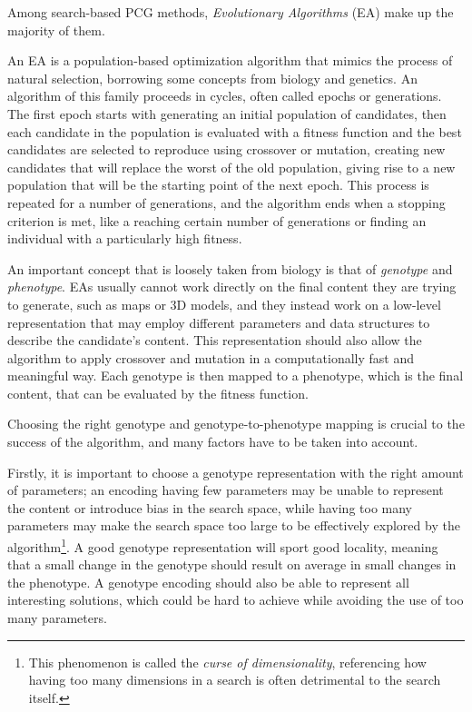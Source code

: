 \documentclass{Configuration_Files/PoliMi3i_thesis}
\begin{document}
Among search-based PCG methods, \textit{Evolutionary Algorithms} (EA) make up the majority of them. \cite{togelius_search-based_2010}

An EA is a population-based optimization algorithm that mimics the process of natural selection, borrowing some concepts from biology and genetics. An algorithm of this family proceeds in cycles, often called epochs or generations. The first epoch starts with generating an initial population of candidates, then each candidate in the population is evaluated with a fitness function and the best candidates are selected to reproduce using crossover or mutation, creating new candidates that will replace the worst of the old population, giving rise to a new population that will be the starting point of the next epoch. This process is repeated for a number of generations, and the algorithm ends when a stopping criterion is met, like a reaching certain number of generations or finding an individual with a particularly high fitness. \cite{lones_sean_2011}

An important concept that is loosely taken from biology is that of \textit{genotype} and \textit{phenotype}. EAs usually cannot work directly on the final content they are trying to generate, such as maps or 3D models, and they instead work on a low-level representation that may employ different parameters and data structures to describe the candidate's content. This representation should also allow the algorithm to apply crossover and mutation in a computationally fast and meaningful way. Each genotype is then mapped to a phenotype, which is the final content, that can be evaluated by the fitness function. \cite{togelius_search-based_2010}

Choosing the right genotype and genotype-to-phenotype mapping is crucial to the success of the algorithm, and many factors have to be taken into account. 

Firstly, it is important to choose a genotype representation with the right amount of parameters; an encoding having few parameters may be unable to represent the content or introduce bias in the search space, while having too many parameters may make the search space too large to be effectively explored by the algorithm\footnote{This phenomenon is called the \textit{curse of dimensionality}, referencing how having too many dimensions in a search is often detrimental to the search itself.}.
A good genotype representation will sport good locality, meaning that a small change in the genotype should result on average in small changes in the phenotype.
A genotype encoding should also be able to represent all interesting solutions, which could be hard to achieve while avoiding the use of too many parameters. \cite{togelius_search-based_2010}
\end{document}
